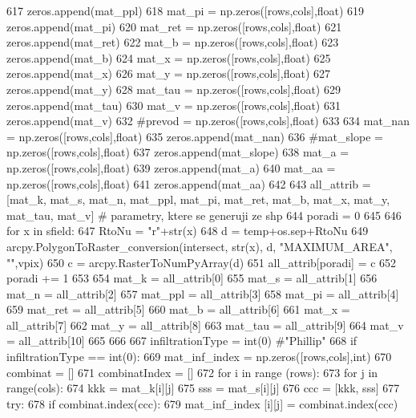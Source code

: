 \begin{DoxyCode}
617   zeros.append(mat\_ppl)
618   mat\_pi = np.zeros([rows,cols],float)
619   zeros.append(mat\_pi)
620   mat\_ret = np.zeros([rows,cols],float)
621   zeros.append(mat\_ret)
622   mat\_b = np.zeros([rows,cols],float)
623   zeros.append(mat\_b)
624   mat\_x = np.zeros([rows,cols],float)
625   zeros.append(mat\_x)
626   mat\_y = np.zeros([rows,cols],float)
627   zeros.append(mat\_y)
628   mat\_tau = np.zeros([rows,cols],float)
629   zeros.append(mat\_tau)
630   mat\_v = np.zeros([rows,cols],float)
631   zeros.append(mat\_v)
632   \textcolor{comment}{#prevod = np.zeros([rows,cols],float)
}
633 
634   mat\_nan = np.zeros([rows,cols],float)
635   zeros.append(mat\_nan)
636   \textcolor{comment}{#mat\_slope = np.zeros([rows,cols],float)
}
637   zeros.append(mat\_slope)
638   mat\_a = np.zeros([rows,cols],float)
639   zeros.append(mat\_a)
640   mat\_aa = np.zeros([rows,cols],float)
641   zeros.append(mat\_aa)
642 
643   all\_attrib = [mat\_k, mat\_s, mat\_n, mat\_ppl, mat\_pi, mat\_ret, mat\_b, mat\_x, mat\_y, mat\_tau, mat\_v] \textcolor{comment}{#
       parametry, ktere se generuji ze shp
}
644   poradi = 0
645 
646   \textcolor{keywordflow}{for} x \textcolor{keywordflow}{in} sfield:
647       RtoNu = \textcolor{stringliteral}{"}\textcolor{stringliteral}{r"+str(x)
}
648 \textcolor{stringliteral}{      d = temp+os.sep+RtoNu
}
649 \textcolor{stringliteral}{      arcpy.PolygonToRaster\_conversion(intersect, str(x), d, }\textcolor{stringliteral}{"MAXIMUM\_AREA"}, \textcolor{stringliteral}{""},vpix)
650       c = arcpy.RasterToNumPyArray(d)
651       all\_attrib[poradi] = c
652       poradi += 1
653 
654   mat\_k = all\_attrib[0]
655   mat\_s = all\_attrib[1]
656   mat\_n = all\_attrib[2]
657   mat\_ppl = all\_attrib[3]
658   mat\_pi = all\_attrib[4]
659   mat\_ret = all\_attrib[5]
660   mat\_b = all\_attrib[6]
661   mat\_x = all\_attrib[7]
662   mat\_y = all\_attrib[8]
663   mat\_tau = all\_attrib[9]
664   mat\_v = all\_attrib[10]
665 
666 
667   infiltrationType = int(0) \textcolor{comment}{#"Phillip"
}
668   \textcolor{keywordflow}{if} infiltrationType == int(0):
669       mat\_inf\_index = np.zeros([rows,cols],int)
670       combinat = []
671       combinatIndex = []
672       \textcolor{keywordflow}{for} i \textcolor{keywordflow}{in} range (rows):
673         \textcolor{keywordflow}{for} j \textcolor{keywordflow}{in} range(cols):
674             kkk = mat\_k[i][j]
675             sss = mat\_s[i][j]
676             ccc = [kkk, sss]
677             \textcolor{keywordflow}{try}:
678               \textcolor{keywordflow}{if} combinat.index(ccc):
679                 mat\_inf\_index [i][j] = combinat.index(ccc)

\end{DoxyCode}

